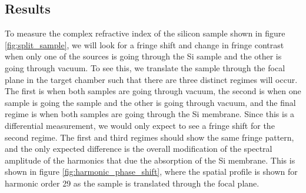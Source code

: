 \subsection{Results}
To measure the complex refractive index of the silicon sample shown in figure \ref{fig:split_sample}, we will look for a fringe shift and change in fringe contrast when only one of the sources is going through the Si sample and the other is going through vacuum.  To see this, we translate the sample through the focal plane in the target chamber such that there are three distinct regimes will occur.  The first is when both samples are going through vacuum, the second is when one sample is going the sample and the other is going through vacuum, and the final regime is when both samples are going through the Si membrane.  Since this is a differential measurement, we would only expect to see a fringe shift for the second regime.  The first and third regimes should show the same fringe pattern, and the only expected difference is the overall modification of the spectral amplitude of the harmonics that due the absorption of the Si membrane.  This is shown in figure \ref{fig:harmonic_phase_shift}, where the spatial profile is shown for harmonic order 29 as the sample is translated through the focal plane.  
